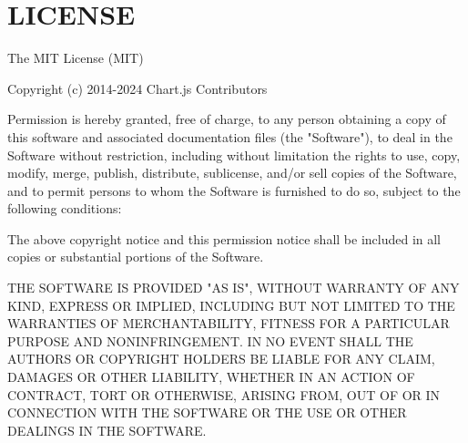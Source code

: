 \chapter{LICENSE}
\hypertarget{md_tests_2security_2node__modules_2_8pnpm_2chart_8js_0d4_84_88_2node__modules_2chart_8js_2_l_i_c_e_n_s_e}{}\label{md_tests_2security_2node__modules_2_8pnpm_2chart_8js_0d4_84_88_2node__modules_2chart_8js_2_l_i_c_e_n_s_e}
The MIT License (MIT)

Copyright (c) 2014-\/2024 Chart.\+js Contributors

Permission is hereby granted, free of charge, to any person obtaining a copy of this software and associated documentation files (the "{}\+Software"{}), to deal in the Software without restriction, including without limitation the rights to use, copy, modify, merge, publish, distribute, sublicense, and/or sell copies of the Software, and to permit persons to whom the Software is furnished to do so, subject to the following conditions\+:

The above copyright notice and this permission notice shall be included in all copies or substantial portions of the Software.

THE SOFTWARE IS PROVIDED "{}\+AS IS"{}, WITHOUT WARRANTY OF ANY KIND, EXPRESS OR IMPLIED, INCLUDING BUT NOT LIMITED TO THE WARRANTIES OF MERCHANTABILITY, FITNESS FOR A PARTICULAR PURPOSE AND NONINFRINGEMENT. IN NO EVENT SHALL THE AUTHORS OR COPYRIGHT HOLDERS BE LIABLE FOR ANY CLAIM, DAMAGES OR OTHER LIABILITY, WHETHER IN AN ACTION OF CONTRACT, TORT OR OTHERWISE, ARISING FROM, OUT OF OR IN CONNECTION WITH THE SOFTWARE OR THE USE OR OTHER DEALINGS IN THE SOFTWARE. 